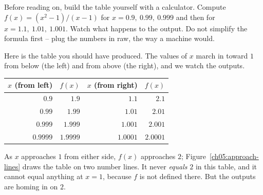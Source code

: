 \begin{labbox}
Before reading on, build the table yourself with a calculator. Compute $f(x) = (x^2-1)/(x-1)$
for $x = 0.9,\ 0.99,\ 0.999$ and then for $x = 1.1,\ 1.01,\ 1.001$. Watch what happens to the
output. Do not simplify the formula first -- plug the numbers in raw, the way a machine would.
\end{labbox}

Here is the table you should have produced. The values of $x$ march in toward $1$ from below
(the left) and from above (the right), and we watch the outputs.

\begin{center}
\begin{tabular}{rr@{\qquad}rr}
\toprule
$x$ (from left) & $f(x)$ & $x$ (from right) & $f(x)$ \\
\midrule
$0.9$    & $1.9$    & $1.1$    & $2.1$ \\
$0.99$   & $1.99$   & $1.01$   & $2.01$ \\
$0.999$  & $1.999$  & $1.001$  & $2.001$ \\
$0.9999$ & $1.9999$ & $1.0001$ & $2.0001$ \\
\bottomrule
\end{tabular}
\end{center}

As $x$ approaches $1$ from either side, $f(x)$ approaches $2$; Figure~\ref{ch05:approach-lines}
draws the table on two number lines. It
never \emph{equals} $2$ in this table, and it cannot equal anything at $x=1$, because $f$ is
not defined there. But the outputs are homing in on $2$.


